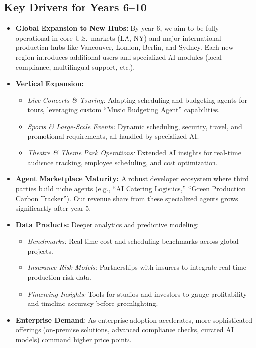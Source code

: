 \documentclass[11pt]{article}
\begin{document}
\subsection{Key Drivers for Years 6--10}
\begin{itemize}
    \item \textbf{Global Expansion to New Hubs:} By year 6, we aim to be fully operational in core U.S.\ markets (LA, NY) and major international production hubs like Vancouver, London, Berlin, and Sydney. Each new region introduces additional users and specialized AI modules (local compliance, multilingual support, etc.).
    \item \textbf{Vertical Expansion:}
    \begin{itemize}
        \item \textit{Live Concerts \& Touring:} Adapting scheduling and budgeting agents for tours, leveraging custom “Music Budgeting Agent” capabilities.
        \item \textit{Sports \& Large-Scale Events:} Dynamic scheduling, security, travel, and promotional requirements, all handled by specialized AI.
        \item \textit{Theatre \& Theme Park Operations:} Extended AI insights for real-time audience tracking, employee scheduling, and cost optimization.
    \end{itemize}
    \item \textbf{Agent Marketplace Maturity:} A robust developer ecosystem where third parties build niche agents (e.g., “AI Catering Logistics,” “Green Production Carbon Tracker”). Our revenue share from these specialized agents grows significantly after year 5.
    \item \textbf{Data Products:} Deeper analytics and predictive modeling:
    \begin{itemize}
        \item \textit{Benchmarks:} Real-time cost and scheduling benchmarks across global projects.
        \item \textit{Insurance Risk Models:} Partnerships with insurers to integrate real-time production risk data.
        \item \textit{Financing Insights:} Tools for studios and investors to gauge profitability and timeline accuracy before greenlighting.
    \end{itemize}
    \item \textbf{Enterprise Demand:} As enterprise adoption accelerates, more sophisticated offerings (on-premise solutions, advanced compliance checks, curated AI models) command higher price points.
\end{itemize}
\end{document}
